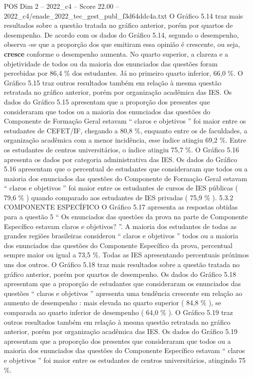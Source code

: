 \begin{textsample}{POS Dim 2 – 2022\_c4 – Score 22.00 – 2022\_c4/enade\_2022\_tec\_gest\_publ\_f3d64ddc4a.txt}
O Gráfico 5.14 traz mais resultados sobre a questão tratada no gráfico anterior, porém por quartos de desempenho.
De acordo com os dados do Gráfico 5.14, segundo o desempenho, observa -se que a proporção dos que emitiram essa opinião é crescente, ou seja, \textbf{cresce} conforme o desempenho aumenta.
No quarto superior, a clareza e a objetividade de todos ou da maioria dos enunciados das questões foram percebidas por 86,4 \% dos estudantes.
Já no primeiro quarto inferior, 66,0 \%.
O Gráfico 5.15 traz outros resultados também em relação à mesma questão retratada no gráfico anterior, porém por organização acadêmica das IES.
Os dados do Gráfico 5.15 apresentam que a proporção dos presentes que consideraram que todos ou a maioria dos enunciados das questões do Componente de Formação Geral estavam “ claros e objetivos ” foi maior entre os estudantes de CEFET/IF, chegando a 80,8 \%, enquanto entre os de faculdades, a organização acadêmica com a menor incidência, esse índice atingiu 69,2 \%.
Entre os estudantes de centros universitários, o índice atingiu 75,7 \%.
O Gráfico 5.16 apresenta os dados por categoria administrativa das IES.
Os dados do Gráfico 5.16 apresentam que o percentual de estudantes que consideraram que todos ou a maioria dos enunciados das questões do Componente de Formação Geral estavam “ claros e objetivos ” foi maior entre os estudantes de cursos de IES públicas ( 79,6 \% ) quando comparado aos estudantes de IES privadas ( 75,9 \% ). 5.3.2 COMPONENTE ESPECÍFICO O Gráfico 5.17 apresenta as respostas obtidas para a questão 5 “ Os enunciados das questões da prova na parte de Componente Específico estavam claros e objetivos? ”.
A maioria dos estudantes de todas as grandes regiões brasileiras considerou “ claros e objetivos ” todos ou a maioria dos enunciados das questões do Componente Específico da prova, percentual sempre maior ou igual a 73,5 \%.
Todas as IES apresentando percentuais próximos uns dos outros.
O Gráfico 5.18 traz mais resultados sobre a questão tratada no gráfico anterior, porém por quartos de desempenho.
Os dados do Gráfico 5.18 apresentam que a proporção de estudantes que consideraram os enunciados das questões “ claros e objetivos ” apresenta uma tendência crescente em relação ao aumento de desempenho : mais elevada no quarto superior ( 84,8 \% ), se comparada ao quarto inferior de desempenho ( 64,0 \% ).
O Gráfico 5.19 traz outros resultados também em relação à mesma questão retratada no gráfico anterior, porém por organização acadêmica das IES.
Os dados do Gráfico 5.19 apresentam que a proporção dos presentes que consideraram que todos ou a maioria dos enunciados das questões do Componente Específico estavam “ claros e objetivos ” foi maior entre os estudantes de centros universitários, atingindo 75 \%.

\end{textsample}
